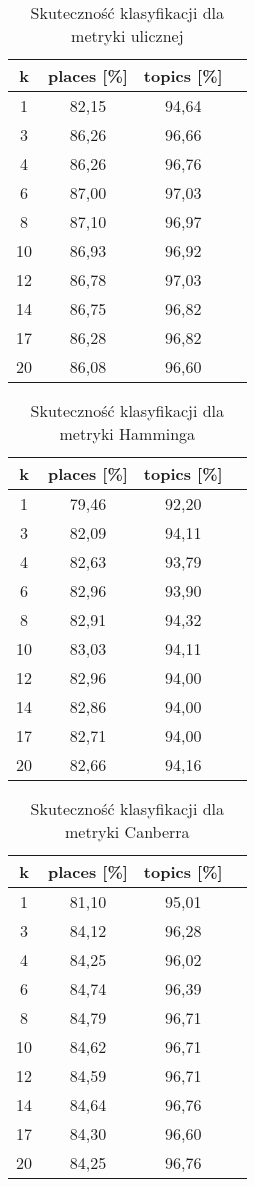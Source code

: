\documentclass{classrep}
\begin{document}
\begin{table}[H]
	\centering
	\begin{tabular}{c c c c} 
		\hline
		\textbf{k} & \textbf{places [\%]} & \textbf{topics [\%]} \\ [0.5ex] 
		\hline
		\hline 
1	&	82,15	&	94,64	\\
3	&	86,26	&	96,66	\\
4	&	86,26	&	96,76	\\
6	&	87,00	&	97,03	\\
8	&	87,10	&	96,97	\\
10	&	86,93	&	96,92	\\
12	&	86,78	&	97,03	\\
14	&	86,75	&	96,82	\\
17	&	86,28	&	96,82	\\
20	&	86,08	&	96,60	\\
		\hline
	\end{tabular}
	\caption{Skuteczność klasyfikacji dla metryki ulicznej}
\end{table}

\begin{table}[H]
	\centering
	\begin{tabular}{c c c c} 
		\hline
		\textbf{k} & \textbf{places [\%]} & \textbf{topics [\%]} \\ [0.5ex] 
		\hline
		\hline 
1	&	79,46	&	92,20	\\
3	&	82,09	&	94,11	\\
4	&	82,63	&	93,79	\\
6	&	82,96	&	93,90	\\
8	&	82,91	&	94,32	\\
10	&	83,03	&	94,11	\\
12	&	82,96	&	94,00	\\
14	&	82,86	&	94,00	\\
17	&	82,71	&	94,00	\\
20	&	82,66	&	94,16	\\
		\hline
	\end{tabular}
	\caption{Skuteczność klasyfikacji dla metryki Hamminga}
\end{table}

\begin{table}[H]
	\centering
	\begin{tabular}{c c c c} 
		\hline
		\textbf{k} & \textbf{places [\%]} & \textbf{topics [\%]} \\ [0.5ex] 
		\hline
		\hline 
1	&	81,10	&	95,01	\\
3	&	84,12	&	96,28	\\
4	&	84,25	&	96,02	\\
6	&	84,74	&	96,39	\\
8	&	84,79	&	96,71	\\
10	&	84,62	&	96,71	\\
12	&	84,59	&	96,71	\\
14	&	84,64	&	96,76	\\
17	&	84,30	&	96,60	\\
20	&	84,25	&	96,76	\\
		\hline
	\end{tabular}
	\caption{Skuteczność klasyfikacji dla metryki Canberra}
\end{table}
\end{document}

